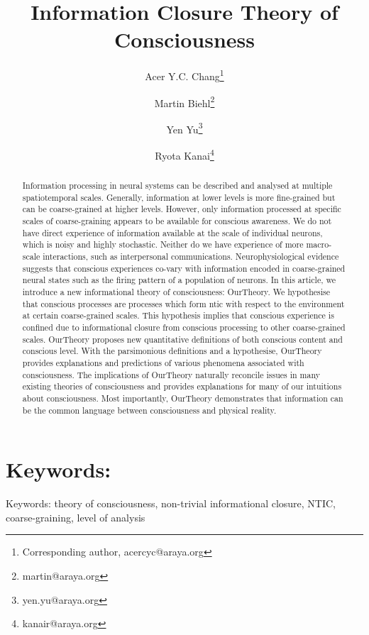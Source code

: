 \documentclass[utf8]{article}
\title{Information Closure Theory of Consciousness}
\date{}
\author[]{Acer Y.C. Chang\thanks{Corresponding author, acercyc@araya.org}}
\author[]{Martin Biehl\thanks{martin@araya.org}}
\author[]{Yen Yu\thanks{yen.yu@araya.org}}
\author[]{Ryota Kanai\thanks{kanair@araya.org }}
\affil[]{ARAYA, Inc., Tokyo, Japan}
\begin{document}
    \linenumbers
	\maketitle
	\tableofcontents


	\begin{abstract}
		Information processing in neural systems can be described and analysed at multiple spatiotemporal scales. Generally, information at lower levels is more fine-grained but can be coarse-grained at higher levels. However, only information processed at specific scales of coarse-graining appears to be available for conscious awareness. We do not have direct experience of information available at the scale of individual neurons, which is noisy and highly stochastic. Neither do we have experience of more macro-scale interactions, such as interpersonal communications. Neurophysiological evidence suggests that conscious experiences co-vary with information encoded in coarse-grained neural states such as the firing pattern of a population of neurons. In this article, we introduce a new informational theory of consciousness: \acf{OurTheory}. We hypothesise that conscious processes are processes which form \ac{ntic} with respect to the environment at certain coarse-grained scales. This hypothesis implies that conscious experience is confined due to informational closure from conscious processing to other coarse-grained scales. \ac{OurTheory} proposes new quantitative definitions of both conscious content and conscious level. With the parsimonious definitions and a hypothesise, \ac{OurTheory} provides explanations and predictions of various phenomena associated with consciousness. The implications of \ac{OurTheory} naturally reconcile issues in many existing theories of consciousness and provides explanations for many of our intuitions about consciousness. Most importantly, \ac{OurTheory} demonstrates that information can be the common language between consciousness and physical reality.

		
	\end{abstract}


	\section*{Keywords:}
	Keywords: theory of consciousness, non-trivial informational closure, NTIC, coarse-graining, level of analysis

\end{document}
